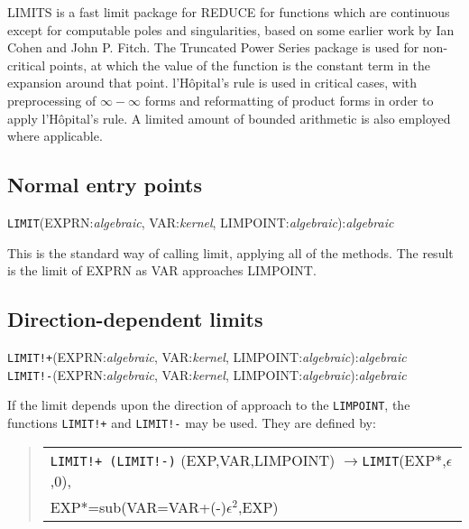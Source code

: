 
LIMITS is a fast limit package for REDUCE for functions which are
continuous except for computable poles and singularities, based on some
earlier work by Ian Cohen and John P. Fitch.  The Truncated Power Series
package is used for non-critical points, at which the value of the
function is the constant term in the expansion around that point.
l'H\^opital's rule is used in critical cases, with preprocessing of
$\infty - \infty$ forms and reformatting of product forms in order
to apply l'H\^opital's rule.  A limited amount of bounded arithmetic
is also employed where applicable.

\subsection{Normal entry points}
\hypertarget{operator:LIMIT}{}
\vspace{.1in}
\noindent \texttt{LIMIT}(EXPRN:{\em algebraic}, VAR:{\em kernel},
LIMPOINT:{\em algebraic}):{\em algebraic}
\vspace{.1in}

This is the standard way of calling limit, applying all of the methods. The
result is the limit of EXPRN as VAR approaches LIMPOINT.


\subsection{Direction-dependent limits}

 
\hypertarget{operator:LIMIT+}{}
\hypertarget{operator:LIMIT-}{}
\vspace{.1in}
\noindent \texttt{LIMIT!+}(EXPRN:{\em algebraic}, VAR:{\em kernel},
LIMPOINT:{\em algebraic}):{\em algebraic} \\
\noindent \texttt{LIMIT!-}(EXPRN:{\em algebraic}, VAR:{\em kernel},
LIMPOINT:{\em algebraic}):{\em algebraic}
\vspace{.1in}

If the limit depends upon the direction of approach to the \texttt{LIMPOINT},
the functions \texttt{LIMIT!+} and \texttt{LIMIT!-} may be used.  They are
defined by:
\begin{quote}
\begin{tabular}{l}
 \texttt{LIMIT!+ (LIMIT!-)} (EXP,VAR,LIMPOINT) $\rightarrow$\texttt{LIMIT}(EXP*,$\epsilon$,0), \\
  \qquad EXP*=sub(VAR=VAR+(-)$\epsilon^2$,EXP)
\end{tabular}
\end{quote}

